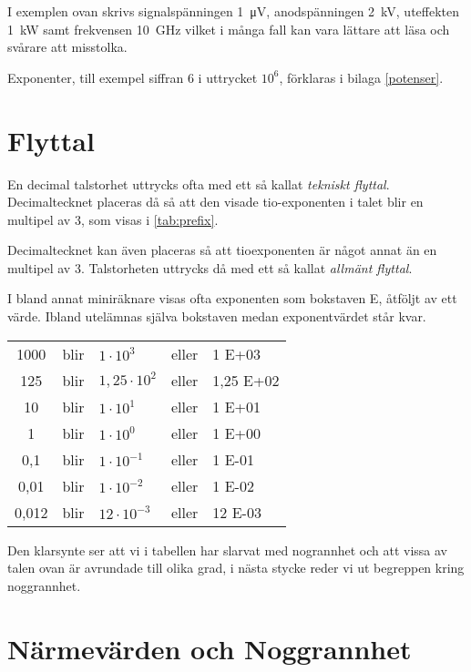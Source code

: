 I exemplen ovan skrivs signalspänningen \SI{1}{\micro\volt},
anodspänningen \SI{2}{\kilo\volt}, uteffekten \SI{1}{\kilo\watt} samt
frekvensen \SI{10}{\giga\hertz} vilket i många fall kan vara lättare
att läsa och svårare att misstolka.


Exponenter, till exempel siffran 6 i uttrycket \(10^6\), förklaras i
bilaga \ref{potenser}.


\section{Flyttal}

En decimal talstorhet uttrycks ofta med ett så kallat \emph{tekniskt
flyttal}.  Decimaltecknet placeras då så att den visade tio-exponenten
i talet blir en multipel av 3, som visas i \ref{tab:prefix}.

Decimaltecknet kan även placeras så att tioexponenten är något annat
än en multipel av 3.  Talstorheten uttrycks då med ett så kallat
\emph{allmänt flyttal}.

I bland annat miniräknare visas ofta exponenten som bokstaven E,
åtföljt av ett värde.  Ibland utelämnas själva bokstaven medan
exponentvärdet står kvar.

\bigskip

\noindent\begin{tabular}{Sllll}
1000  & blir & \(1    \cdot 10^3  \) & eller & 1 E+03 \\
125   & blir & \(1,25 \cdot 10^2  \) & eller & 1,25 E+02 \\
10    & blir & \(1    \cdot 10^1  \) & eller & 1 E+01 \\
1     & blir & \(1    \cdot 10^0  \) & eller & 1 E+00 \\
0,1   & blir & \(1    \cdot 10^{-1}\) & eller & 1 E-01 \\
0,01  & blir & \(1    \cdot 10^{-2}\) & eller & 1 E-02 \\
0,012 & blir & \(12   \cdot 10^{-3}\) & eller & 12 E-03 \\
\end{tabular}

\bigskip

Den klarsynte ser att vi i tabellen har slarvat med nogrannhet och att
vissa av talen ovan är avrundade till olika grad, i nästa stycke reder
vi ut begreppen kring noggrannhet.

\section{Närmevärden och Noggrannhet}

